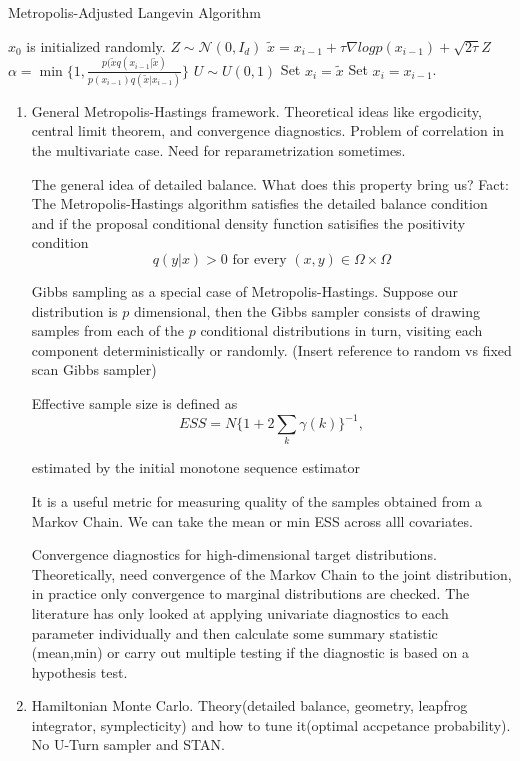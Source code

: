 \documentclass{book}
\begin{document}
\begin{algorithm}
\caption{Metropolis-Adjusted Langevin Algorithm}
\State $x_0$ is initialized randomly.
\State $Z \sim \mathcal{N}(0, I_d) $
\State $\tilde{x}= x_{i-1} + \tau \nabla log p(x_{i-1}) + \sqrt{2 \tau} Z$
\State $\alpha = \min\{1, \frac{p(\tilde{x} q(x_{i-1}|\tilde{x})}{p(x_{i-1})q(\tilde{x}|x_{i-1})}\} $
\State $U \sim U(0,1)$
 \State Set $x_i = \tilde{x}$
\Else{}
 \State Set $x_i = x_{i-1}$.
\EndIf
\EndFor
\EnfFunction
\end{algorithm}
\begin{enumerate} 


\item General Metropolis-Hastings framework. Theoretical ideas like ergodicity, central limit theorem, and convergence diagnostics. Problem of correlation in the multivariate case. Need for reparametrization sometimes.

The general idea of detailed balance. What does this property bring us? 
Fact:
The Metropolis-Hastings algorithm satisfies the detailed balance condition and
if the proposal conditional density function satisifies the positivity condition
\[ q(y|x) > 0 \text{ for every } (x,y) \in \Omega \times \Omega \]


Gibbs sampling as a special case of Metropolis-Hastings.
Suppose our distribution is $p$ dimensional, then the Gibbs sampler consists
of drawing samples from each of the $p$ conditional distributions in turn,
visiting each component deterministically or randomly. (Insert reference to
random vs fixed scan Gibbs sampler)


Effective sample size is defined as 
\[ ESS = N \{ 1 + 2 \sum_k \gamma(k) \}^{-1}, \]

estimated by the initial
monotone sequence estimator \cite{geyer1992practical}

It is a useful metric for measuring quality of the samples obtained from a Markov Chain. We can take the mean or min ESS across alll covariates.

Convergence diagnostics for high-dimensional target distributions. Theoretically, need convergence of the Markov Chain to the joint distribution, in practice only convergence to marginal distributions are checked. The literature has only looked at applying univariate diagnostics to each parameter individually and then calculate some summary statistic (mean,min) or carry out multiple testing if the diagnostic is based on a hypothesis test.
\item Hamiltonian Monte Carlo. Theory(detailed balance, geometry, leapfrog integrator, symplecticity) and how to tune it(optimal accpetance probability). No U-Turn sampler and STAN. 


\end{enumerate}
\end{document}
